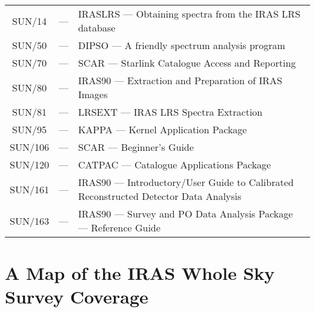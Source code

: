 \begin{tabular}{ccl}
SUN/14&---&IRASLRS --- Obtaining spectra from the IRAS LRS database\\
SUN/50&---&DIPSO --- A friendly spectrum analysis program\\
SUN/70&---&SCAR --- Starlink Catalogue Access and Reporting\\
SUN/80&---&IRAS90 --- Extraction and Preparation of IRAS Images\\
SUN/81&---&LRSEXT --- IRAS LRS Spectra Extraction\\
SUN/95&---&KAPPA --- Kernel Application Package\\
SUN/106&---&SCAR --- Beginner's Guide\\
SUN/120&---&CATPAC --- Catalogue Applications Package\\
SUN/161&---&IRAS90 --- Introductory/User Guide to Calibrated Reconstructed
Detector Data Analysis\\
SUN/163&---&IRAS90 --- Survey and PO Data Analysis Package --- Reference
Guide\\
\end{tabular}
\appendix
\section{A Map of the IRAS Whole Sky Survey Coverage}
\label{a}

